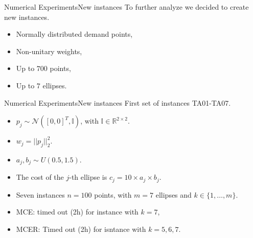 \documentclass{beamer}
\newcommand{\R}{\mathbb{R}}
\theoremstyle{definition}
\begin{document}
\begin{frame}{Numerical Experiments}{New instances}
	To further analyze we decided to create new instances.
	\begin{itemize}
		\item Normally distributed demand points,
		\item Non-unitary weights,
		\item Up to $700$ points,
		\item Up to $7$ ellipses.
	\end{itemize}
\end{frame}

\begin{frame}{Numerical Experiments}{New instances}
	First set of instances TA01-TA07.
	\begin{itemize}
		\item $p_j \sim \mathcal{N}([0, 0]^T, \mathbb{I})$, with $\mathbb{I} \in \R^{2\times 2}$.
		\item $w_j = ||p_j||_2^2$.
		\item $a_j, b_j \sim U(0.5, 1.5)$.
		\item The cost of the $j$-th ellipse is $c_j = 10 \times a_j \times b_j$.
		\item Seven instances $n=100$ points, with $m=7$ ellipses and $k \in \{1,\dots, m\}$.
		\item MCE: timed out (2h) for instance with $k=7$,
		\item MCER: Timed out (2h) for isntance with $k=5,6,7$.
	\end{itemize}
\end{frame}
\end{document}
